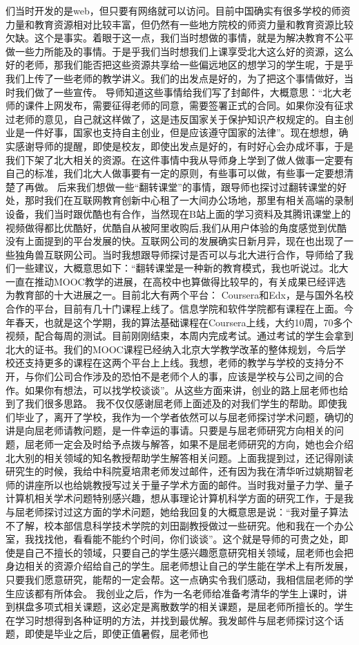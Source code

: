 \documentclass[12pt,twiside,a4paper]{ctexbook}
\numberwithin{chapter}{part}
\begin{document}
们当时开发的是web，但只要有网络就可以访问。目前中国确实有很多学校的师资力量和教育资源相对比较丰富，但仍然有一些地方院校的师资力量和教育资源比较欠缺。这个是事实。着眼于这一点，我们当时想做的事情，就是为解决教育不公平做一些力所能及的事情。于是乎我们当时想我们上课享受北大这么好的资源，这么好的老师，那我们能否把这些资源共享给一些偏远地区的想学习的学生呢，于是乎我们上传了一些老师的教学讲义。我们的出发点是好的，为了把这个事情做好，当时我们做了一些宣传。    导师知道这些事情给我们写了封邮件，大概意思：“北大老师的课件上网发布，需要征得老师的同意，需要签署正式的合同。如果你没有征求过老师的意见，自己就这样做了，这是违反国家关于保护知识产权规定的。自主创业是一件好事，国家也支持自主创业，但是应该遵守国家的法律”。现在想想，确实感谢导师的提醒，即使是校友，即使出发点是好的，有时好心会办成坏事，于是我们下架了北大相关的资源。在这件事情中我从导师身上学到了做人做事一定要有自己的标准，我们北大人做事要有一定的原则，有些事可以做，有些事一定要想清楚了再做。    后来我们想做一些“翻转课堂”的事情，跟导师也探讨过翻转课堂的好处，那时我们在互联网教育创新中心租了一大间办公场地，那里有相关高端的录制设备，我们当时跟优酷也有合作，当然现在B站上面的学习资料及其腾讯课堂上的视频做得都比优酷好，优酷自从被阿里收购后,我们从用户体验的角度感觉到优酷没有上面提到的平台发展的快。互联网公司的发展确实日新月异，现在也出现了一些独角兽互联网公司。当时我想跟导师探讨是否可以与北大进行合作，导师给了我们一些建议，大概意思如下：“翻转课堂是一种新的教育模式，我也听说过。北大一直在推动MOOC教学的进展，在高校中也算做得比较早的，有关成果已经评选为教育部的十大进展之一。目前北大有两个平台： Coursera和Edx，是与国外名校合作的平台，目前有几十门课程上线了。信息学院和软件学院都有课程在上面。今年春天，也就是这个学期，我的算法基础课程在Coursera上线，大约10周，70多个视频，配合每周的测试。目前刚刚结束，本周内完成考试。通过考试的学生会拿到北大的证书。我们的MOOC课程已经纳入北京大学教学改革的整体规划，今后学校还支持更多的课程在这两个平台上上线。我想，老师的教学与学校的支持分不开，与你们公司合作涉及的恐怕不是老师个人的事，应该是学校与公司之间的合作。如果你有想法，可以找学校谈谈”。从这些方面来讲，创业的路上屈老师也给到了我们很多思路。    我不仅仅感谢屈老师上面述及的对我们学生的帮助。即使我们毕业了，离开了学校，我作为一个学者依然可以与屈老师探讨学术问题，确切的讲是向屈老师请教问题，是一件幸运的事请。只要是与屈老师研究方向相关的问题，屈老师一定会及时给予点拨与解答，如果不是屈老师研究的方向，她也会介绍北大别的相关领域的知名教授帮助学生解答相关问题。上面我提到过，还记得刚读研究生的时候，我给中科院夏培肃老师发过邮件，还有因为我在清华听过姚期智老师的讲座所以也给姚教授写过关于量子学术方面的邮件。当时我对量子力学、量子计算机相关学术问题特别感兴趣，想从事理论计算机科学方面的研究工作，于是我与屈老师探讨过这方面的学术问题，她给我回复的大概意思是说：“我对量子算法不了解，校本部信息科学技术学院的刘田副教授做过一些研究。他和我在一个办公室，我找找他，看看能不能约个时间，你们谈谈”。这个就是导师的可贵之处，即使是自己不擅长的领域，只要自己的学生感兴趣愿意研究相关领域，屈老师也会把身边相关的资源介绍给自己的学生。屈老师想让自己的学生能在学术上有所发展，只要我们愿意研究，能帮的一定会帮。这一点确实令我们感动，我相信屈老师的学生应该都有所体会。    我创业之后，作为一名老师给准备考清华的学生上课时，讲到棋盘多项式相关课题，这必定是离散数学的相关课题，是屈老师所擅长的。学生在学习时想得到各种证明的方法，并找到最优解。我发邮件与屈老师探讨这个话题，即使是毕业之后，即使正值暑假，屈老师也
\end{document}

